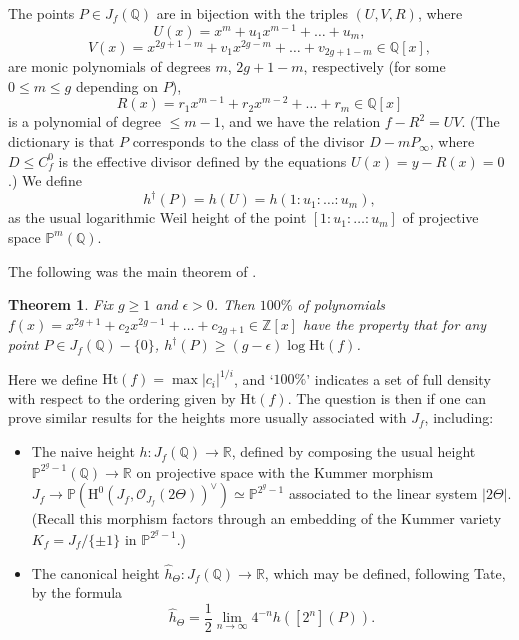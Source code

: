 \documentclass{article} %
\newtheorem{theorem}[proposition]{Theorem}
\numberwithin{equation}{section}
\renewcommand{\P}{\mathbb{P}}
\renewcommand{\O}{\mathcal{O}}
\newcommand{\HH}{\mathrm{H}}
\newcommand{\R}{\mathbb{R}}
\newcommand{\Q}{\mathbb{Q}}
\newcommand{\Z}{\mathbb{Z}}
\newcommand{\height}{\mathrm{Ht}}
\begin{document}
The points $P \in J_f(\Q)$ are in bijection with the  triples $(U, V, R)$, where 
\[ U(x) = x^m + u_1 x^{m-1} + \dots + u_m, \]
\[ V(x) = x^{2g+1-m} + v_1 x^{2g-m} + \dots + v_{2g+1-m} \in \Q[x], \]
 are monic polynomials of degrees $m$, $2g+1-m$, respectively (for some $0 \leq m \leq g$ depending on $P$), 
 \[ R(x) = r_1 x^{m-1} + r_2 x^{m-2} + \dots + r_{m} \in \Q[x]\]
is a polynomial of degree $\leq m-1$, and we have the relation $f - R^2 = UV$. (The dictionary is that $P$ corresponds to the class of the divisor $D - m P_\infty$, where $D \leq C_f^0$ is the effective divisor defined by the equations $U(x) = y - R(x) = 0$.) We define 
\[ h^\dagger(P) = h(U) = h( 1 : u_1 : \dots : u_m), \]
as the usual logarithmic Weil height of the point $[1 : u_1 : \dots : u_m]$ of projective space $\P^m(\Q)$. 

The following was the main theorem of \cite{lagathorne2024smallheightoddhyperelliptic}.
\begin{theorem}\label{introthm_lower_bound_for_dagger_height}
    Fix $g \geq 1$ and $\epsilon > 0$. Then $100\%$ of polynomials $f(x) = x^{2g+1} + c_2 x^{2g-1} + \dots + c_{2g+1} \in \Z[x]$ have the property that for any point $P \in J_f(\Q) - \{ 0 \}$, $h^\dagger(P) \geq (g - \epsilon) \log \height(f)$.
\end{theorem}
Here we define $\height(f) = \max |c_i|^{1/i}$, and `$100\%$' indicates a set of full density with respect to the ordering given by $\height(f)$. The question is then if one can prove similar results for the heights more usually associated with $J_f$, including:
\begin{itemize}
    \item The naive height $h : J_f(\Q) \to \R$, defined by composing the usual height $\P^{2^g-1}(\Q) \to \R$ on projective space  with the Kummer morphism $J_f \to 
    \P(\HH^0(J_f, \O_{J_f}(2\Theta))^{\vee}) \simeq\P^{2^g-1}$ associated to the linear system $| 2 \Theta |$. (Recall this morphism factors through an embedding of the Kummer variety $K_f = J_f / \{ \pm 1 \}$ in $\P^{2^g-1}$.)
    \item The canonical height $\widehat{h}_\Theta : J_f(\Q) \to \R$, which may be defined, following Tate, by the formula
    \[ \widehat{h}_\Theta = \frac{1}{2} \lim_{n \to \infty} 4^{-n} h([2^n](P)).\]
\end{itemize}
\end{document}
